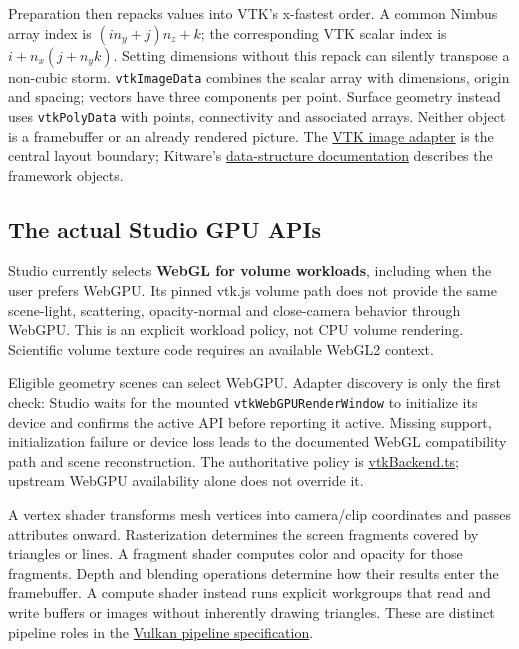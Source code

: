 \documentclass[
  11pt,
]{article}
\begin{document}
Preparation then repacks values into VTK's x-fastest order. A common
Nimbus array index is \((i n_y+j)n_z+k\); the corresponding VTK scalar
index is \(i+n_x(j+n_yk)\). Setting dimensions without this repack can
silently transpose a non-cubic storm. \texttt{vtkImageData} combines the
scalar array with dimensions, origin and spacing; vectors have three
components per point. Surface geometry instead uses \texttt{vtkPolyData}
with points, connectivity and associated arrays. Neither object is a
framebuffer or an already rendered picture. The
\href{../ui/src/lib/vtk/vtkImageData.ts}{VTK image adapter} is the
central layout boundary; Kitware's
\href{https://kitware.github.io/vtk-js/docs/structures.html}{data-structure
documentation} describes the framework objects.

\subsection{The actual Studio GPU
APIs}\label{the-actual-studio-gpu-apis}

Studio currently selects \textbf{WebGL for volume workloads}, including
when the user prefers WebGPU. Its pinned vtk.js volume path does not
provide the same scene-light, scattering, opacity-normal and
close-camera behavior through WebGPU. This is an explicit workload
policy, not CPU volume rendering. Scientific volume texture code
requires an available WebGL2 context.

Eligible geometry scenes can select WebGPU. Adapter discovery is only
the first check: Studio waits for the mounted
\texttt{vtkWebGPURenderWindow} to initialize its device and confirms the
active API before reporting it active. Missing support, initialization
failure or device loss leads to the documented WebGL compatibility path
and scene reconstruction. The authoritative policy is
\href{../ui/src/lib/vtk/vtkBackend.ts}{vtkBackend.ts}; upstream WebGPU
availability alone does not override it.

A vertex shader transforms mesh vertices into camera/clip coordinates
and passes attributes onward. Rasterization determines the screen
fragments covered by triangles or lines. A fragment shader computes
color and opacity for those fragments. Depth and blending operations
determine how their results enter the framebuffer. A compute shader
instead runs explicit workgroups that read and write buffers or images
without inherently drawing triangles. These are distinct pipeline roles
in the
\href{https://docs.vulkan.org/spec/latest/chapters/pipelines.html}{Vulkan
pipeline specification}.
\end{document}
